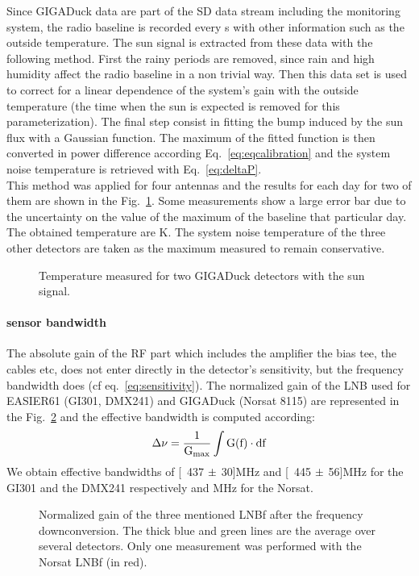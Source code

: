 Since GIGADuck data are  part of  the SD  data stream  including the monitoring system, the radio  baseline is recorded every \unit[400]{s} with other  information such as  the outside temperature. The sun signal is extracted from these data with the following method.  First the rainy periods are removed, since rain and  high humidity  affect the radio  baseline in a non trivial way. Then this data set is used to correct for a linear  dependence of the system's gain with the outside temperature (the time when the sun is expected is removed for this parameterization). The final step consist in fitting the bump induced by the sun flux with a Gaussian function. The maximum of the fitted function is then converted in power difference according Eq.~\eqref{eq:eqcalibration} and the system noise temperature is retrieved with Eq.~\eqref{eq:deltaP}.\\ This method was applied for four antennas and the results for each day for two of them are shown in the Fig.~\ref{fig:GDtempres}. Some measurements show a large error bar due to the uncertainty on the value of the maximum of the baseline that particular day. The obtained temperature are \unit[39, 45, 59 and 70]{K}. The system noise temperature of the three other detectors are taken as the maximum measured to remain conservative.

\begin{figure}[!ht]
 \centering
 \hspace*{-3ex}
  \caption{Temperature measured for two GIGADuck detectors with the sun signal.}
 \label{fig:GDtempres}
\end{figure}


\paragraph{sensor bandwidth}
The absolute gain  of the RF part which includes the amplifier the bias tee, the cables etc, does  not  enter  directly in  the  detector's sensitivity,     but    the     frequency    bandwidth     does    (cf eq.~\ref{eq:sensitivity}).  The  normalized gain  of the LNB  used for EASIER61 (GI301, DMX241) and GIGADuck (Norsat 8115) are represented in the  Fig.~\ref{fig:normalizedgain}  and  the  effective  bandwidth  is computed according:
\begin{equation}
  \rm \Delta \nu = \frac{1}{G_{max}} \int G(f) \cdot df
\end{equation}
We  obtain effective bandwidths  of \unit[437  $\rm \pm$  30]{MHz} and
\unit[445 $\rm \pm$ 56]{MHz} for the GI301 and the DMX241 respectively
and \unit[750]{MHz} for the Norsat.
\begin{figure}[!ht]
  \centering
  \hspace*{-3ex}
  \caption{Normalized  gain  of the  three  mentioned  LNBf after  the
    frequency downconversion.  The thick blue and green  lines are the
    average over several detectors. Only one measurement was performed
    with the Norsat LNBf (in red). }
  \label{fig:normalizedgain}
\end{figure}


